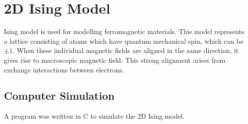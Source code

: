 \documentclass[11pt, oneside]{article}   	%
\begin{document}
\section{2D Ising Model}
Ising model is used for modelling ferromagnetic materials. This model represents a lattice consisting of atoms which have quantum mechanical spin, which can be $ \pm 1$. When these individual magnetic fields are aligned in the same direction, it gives rise to macroscopic magnetic field. This strong alignment arises from exchange interactions between electrons.

\vspace{-2ex} \subsection{Computer Simulation}
\vspace{-2ex} A program was written  in C to simulate the 2D Ising model.

\end{document}
